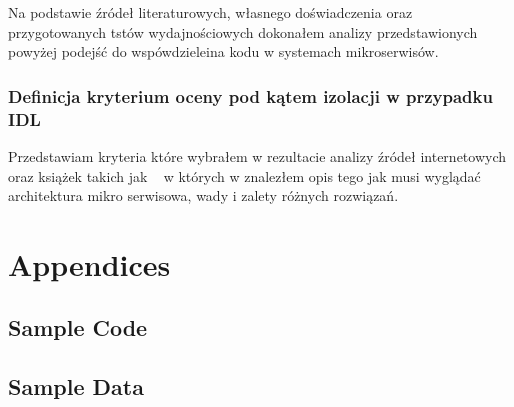 \documentclass[runningheads,12pt]{llncs} \usepackage{graphicx} \usepackage{todonotes} \usepackage{fancyhdr} \usepackage{lipsum} \usepackage[T1]{fontenc} \usepackage[provide=*,english,polish]{babel}
\begin{document}
Na podstawie źródeł literaturowych, własnego doświadczenia oraz przygotowanych tstów wydajnościowych dokonałem analizy przedstawionych powyżej podejść do wspówdzieleina kodu w systemach mikroserwisów.

\subsubsection{Definicja kryterium oceny pod kątem izolacji w przypadku IDL}

Przedstawiam kryteria które wybrałem w rezultacie analizy źródeł internetowych oraz książek takich jak ~\cite{kleppmann2017designing} w których w znalezłem opis tego jak musi wyglądać architektura mikro serwisowa, wady i zalety różnych rozwiązań.



\nocite{*}

\listoffigures

\listoftables

 

\section{Appendices}

\subsection{Sample Code} \subsection{Sample Data}
\end{document}
